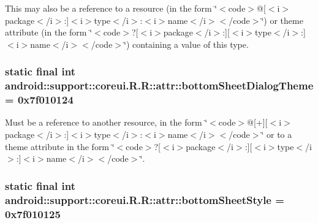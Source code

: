 This may also be a reference to a resource (in the form \char`\"{}$<$code$>$@\mbox{[}$<$i$>$package$<$/i$>$:\mbox{]}$<$i$>$type$<$/i$>$:$<$i$>$name$<$/i$>$$<$/code$>$\char`\"{}) or theme attribute (in the form \char`\"{}$<$code$>$?\mbox{[}$<$i$>$package$<$/i$>$:\mbox{]}\mbox{[}$<$i$>$type$<$/i$>$:\mbox{]}$<$i$>$name$<$/i$>$$<$/code$>$\char`\"{}) containing a value of this type. \hypertarget{classandroid_1_1support_1_1coreui_1_1_r_1_1attr_653cb07e2c1131cac1c423f036590e0f}{
\subsubsection[{bottomSheetDialogTheme}]{\setlength{\rightskip}{0pt plus 5cm}static final int android::support::coreui.R.R::attr::bottomSheetDialogTheme = 0x7f010124}}
\label{classandroid_1_1support_1_1coreui_1_1_r_1_1attr_653cb07e2c1131cac1c423f036590e0f}


Must be a reference to another resource, in the form \char`\"{}$<$code$>$@\mbox{[}+\mbox{]}\mbox{[}$<$i$>$package$<$/i$>$:\mbox{]}$<$i$>$type$<$/i$>$:$<$i$>$name$<$/i$>$$<$/code$>$\char`\"{} or to a theme attribute in the form \char`\"{}$<$code$>$?\mbox{[}$<$i$>$package$<$/i$>$:\mbox{]}\mbox{[}$<$i$>$type$<$/i$>$:\mbox{]}$<$i$>$name$<$/i$>$$<$/code$>$\char`\"{}. \hypertarget{classandroid_1_1support_1_1coreui_1_1_r_1_1attr_1203f271003516e69037cb92294fd321}{
\subsubsection[{bottomSheetStyle}]{\setlength{\rightskip}{0pt plus 5cm}static final int android::support::coreui.R.R::attr::bottomSheetStyle = 0x7f010125}}
\label{classandroid_1_1support_1_1coreui_1_1_r_1_1attr_1203f271003516e69037cb92294fd321}


